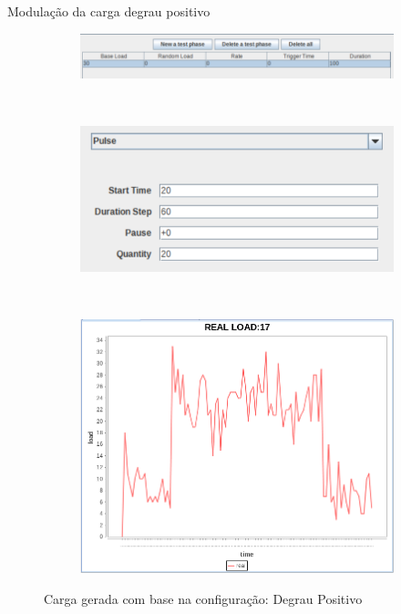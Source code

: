 \begin{frame}{Modulação da carga degrau positivo}
	\begin{figure}[!htb]
		\begin{subfigure}{\linewidth}
			\centering
			\includegraphics[scale=0.35]{../monograph/images/condiguracao-carga-bench4q1.png}
			\label{fig:condiguracao-carga-bench4q1}
		\end{subfigure}\\
		\begin{subfigure}{\linewidth}
			\centering
			\includegraphics[scale=0.35]{../monograph/images/condiguracao-carga-modulada1.png}
			\label{fig:condiguracao-carga-modulada1}
		\end{subfigure}\\[1ex]
		\begin{subfigure}{\linewidth}
			\centering
			\includegraphics[scale=0.3]{../monograph/images/grafico-carga-modulada1.png}
			\label{fig:grafico-carga-modulada1}
		\end{subfigure}
		\caption{Carga gerada com base na configuração: Degrau Positivo}
		\label{fig:carga-modulada1}
	\end{figure}
\end{frame}

